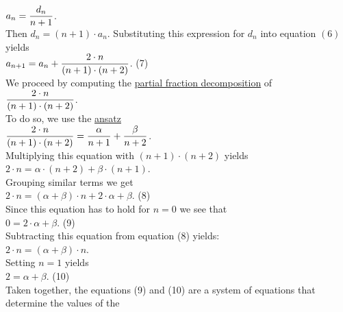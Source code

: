 \\[0.2cm]
\hspace*{1.3cm}
$\displaystyle a_n = \frac{d_n}{n+1}$. 
\\[0.2cm] 
Then $d_n = (n+1) \cdot a_n$.  Substituting this expression for $d_n$ into equation $(6)$ yields
\\[0.2cm]
\hspace*{1.3cm}
$\displaystyle a_{n+1} = a_{n} + \frac{2\cdot n}{(n+1)\cdot(n+2)}$.  \hspace*{\fill} (7)
\\[0.2cm]
We proceed by computing the 
\href{http://en.wikipedia.org/wiki/Partial_fraction}{partial fraction decomposition}
of 
\\[0.2cm]
\hspace*{1.3cm}
$\displaystyle\frac{2\cdot n}{(n+1)\cdot(n+2)}$.
\\[0.2cm] 
To do so, we use the \href{http://en.wikipedia.org/wiki/Ansatz}{ansatz}
\\[0.2cm]
\hspace*{1.3cm}
$\displaystyle\frac{2\cdot n}{(n+1)\cdot(n+2)} = \frac{\alpha}{n+1} + \frac{\beta}{n+2}$.
\\[0.2cm] 
Multiplying this equation with $(n+1) \cdot (n+2)$ yields
\\[0.2cm]
\hspace*{1.3cm}
$ 2\cdot n = \alpha \cdot (n+2) + \beta \cdot (n+1)$. 
\\[0.2cm]
Grouping similar terms we get
\\[0.2cm]
\hspace*{1.3cm}
$2\cdot n = (\alpha + \beta) \cdot n + 2 \cdot \alpha  + \beta$. \hspace*{\fill} (8)
\\[0.2cm]
Since this equation has to hold for $n = 0$ we see that
\\[0.2cm]
\hspace*{1.3cm}
$0 = 2 \cdot \alpha + \beta$.  \hspace*{\fill} (9)
\\[0.2cm]
Subtracting this equation from equation (8) yields:
\\[0.2cm]
\hspace*{1.3cm}
$2 \cdot n  =  (\alpha + \beta) \cdot n$.
\\[0.2cm]
Setting $n=1$ yields
\\[0.2cm]
\hspace*{1.3cm}
$2  =  \alpha + \beta$.  \hspace*{\fill} (10)
\\[0.2cm]
Taken together, the equations (9) and (10) are a system of equations that determine the values of the
